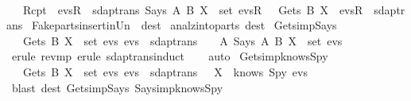 \begin{isabellebody}
  \ \ \isanewline
  \ \ \isanewline
  \ \ {\isacharbar}\ Rcpt{\isacharcolon}\ {\isachardoublequoteopen}{\isasymlbrakk}\ evsR\ {\isasymin}\ sdaptrans{\isacharsemicolon}\ Says\ A\ B\ X\ {\isasymin}\ set\ evsR\ {\isasymrbrakk}\ {\isasymLongrightarrow}\ Gets\ B\ X\ {\isacharhash}\ evsR\ {\isasymin}\ sdaptrans{\isachardoublequoteclose}\isanewline
  \isanewline
  \isanewline
  \isamarkupfalse%
  \ Fake{\isacharunderscore}parts{\isacharunderscore}insert{\isacharunderscore}in{\isacharunderscore}Un\ \ {\isacharbrackleft}dest{\isacharbrackright}\isanewline
  \isamarkupfalse%
  \ analz{\isacharunderscore}into{\isacharunderscore}parts\ {\isacharbrackleft}dest{\isacharbrackright}%
  \isadelimdocument
  \endisadelimdocument
  \isatagdocument
  \isamarkuptrue%
  \endisatagdocument
  {\isafolddocument}%
  \isadelimdocument
  \endisadelimdocument
  \isamarkupfalse%
  \ Gets{\isacharunderscore}imp{\isacharunderscore}Says\ {\isacharcolon}\isanewline
  \ \ {\isachardoublequoteopen}{\isasymlbrakk}\ Gets\ B\ X\ {\isasymin}\ set\ evs{\isacharsemicolon}\ evs\ {\isasymin}\ sdaptrans\ {\isasymrbrakk}\ {\isasymLongrightarrow}\ {\isasymexists}\ A{\isachardot}\ Says\ A\ B\ X\ {\isasymin}\ set\ evs{\isachardoublequoteclose}\isanewline
  \isadelimproof
  \isanewline
  \ \ %
  \endisadelimproof
  \isatagproof
  \isamarkupfalse%
  \ {\isacharparenleft}erule\ rev{\isacharunderscore}mp{\isacharcomma}\ erule\ sdaptrans{\isachardot}induct{\isacharparenright}\isanewline
  \ \ \isamarkupfalse%
  \ {\isacharparenleft}auto{\isacharparenright}\isanewline
  \isamarkupfalse%
  \endisatagproof
  {\isafoldproof}%
  \isadelimproof
  \isanewline
  \endisadelimproof
  \isanewline
  \isamarkupfalse%
  \ Gets{\isacharunderscore}imp{\isacharunderscore}knows{\isacharunderscore}Spy\ {\isacharcolon}\isanewline
  \ \ {\isachardoublequoteopen}{\isasymlbrakk}\ Gets\ B\ X\ {\isasymin}\ set\ evs{\isacharsemicolon}\ evs\ {\isasymin}\ sdaptrans\ {\isasymrbrakk}\ {\isasymLongrightarrow}\ X\ {\isasymin}\ knows\ Spy\ evs{\isachardoublequoteclose}\isanewline
  \isadelimproof
  \endisadelimproof
  \isatagproof
  \isamarkupfalse%
  \ {\isacharparenleft}blast\ dest{\isacharbang}{\isacharcolon}\ Gets{\isacharunderscore}imp{\isacharunderscore}Says\ Says{\isacharunderscore}imp{\isacharunderscore}knows{\isacharunderscore}Spy{\isacharparenright}%
  \endisatagproof
  {\isafoldproof}%

\end{isabellebody}
